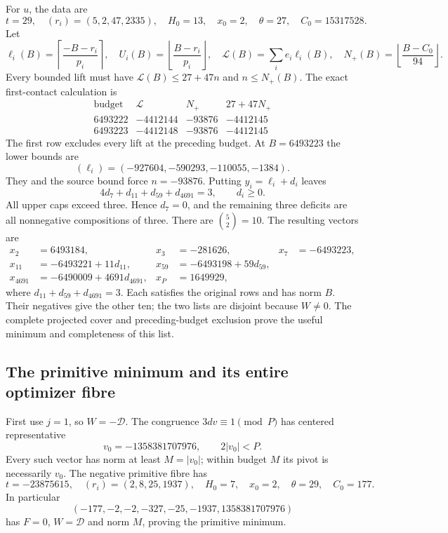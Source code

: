 \documentclass[11pt,a4paper]{article}
\theoremstyle{definition}\newtheorem{question}[theorem]{Question}
\theoremstyle{remark}\newtheorem{remark}[theorem]{Remark}
\newcommand{\Dgen}{\mathcal D}\newcommand{\mpr}{m_{\mathrm{prim}}}
\begin{document}
For \(u\), the data are
\[
 t=29,\quad (r_i)=(5,2,47,2335),\quad H_0=13,\quad
 x_0=2,\quad \theta=27,\quad C_0=15317528.
\]
Let
\[
 \ell_i(B)=\left\lceil\frac{-B-r_i}{p_i}\right\rceil,\quad
 U_i(B)=\left\lfloor\frac{B-r_i}{p_i}\right\rfloor,\quad
 \mathcal L(B)=\sum_i e_i\ell_i(B),\quad
 N_+(B)=\left\lfloor\frac{B-C_0}{94}\right\rfloor.
\]
Every bounded lift must have
\(\mathcal L(B)\le27+47n\) and \(n\le N_+(B)\).
The exact first-contact calculation is
\[
\begin{array}{r|r|r|r}
 \text{budget}&\mathcal L&N_+&27+47N_+\\ \hline
 6493222&-4412144&-93876&-4412145\\
 6493223&-4412148&-93876&-4412145
\end{array}
\]
The first row excludes every lift at the preceding budget.
At \(B=6493223\) the lower bounds are
\[
 (\ell_i)=(-927604,-590293,-110055,-1384).
\]
They and the source bound force \(n=-93876\).
Putting \(y_i=\ell_i+d_i\) leaves
\[
 4d_7+d_{11}+d_{59}+d_{4691}=3,\qquad d_i\ge0.
\]
All upper caps exceed three. Hence \(d_7=0\), and the remaining
three deficits are all nonnegative compositions of three.
There are \(\binom52=10\). The resulting vectors are
\begin{equation}\label{eq:20}
 \begin{aligned}
 x_2&=6493184,&x_3&=-281626,&x_7&=-6493223,\\
 x_{11}&=-6493221+11d_{11},&
 x_{59}&=-6493198+59d_{59},\\
 x_{4691}&=-6490009+4691d_{4691},&
 x_P&=1649929,
 \end{aligned}
\end{equation}
where \(d_{11}+d_{59}+d_{4691}=3\).
Each satisfies the original rows and has norm \(B\).
Their negatives give the other ten; the two lists are disjoint because
\(W\ne0\). The complete projected cover and preceding-budget exclusion
prove the useful minimum and completeness of this list.

\subsection{The primitive minimum and its entire optimizer fibre}
First use \(j=1\), so \(W=-\Dgen\).
The congruence \(3dv\equiv1\pmod P\) has centered representative
\[
 v_0=-1358381707976,\qquad 2|v_0|<P.
\]
Every such vector has norm at least \(M=|v_0|\); within budget \(M\)
its pivot is necessarily \(v_0\).
The negative primitive fibre has
\[
 t=-23875615,\quad(r_i)=(2,8,25,1937),\quad
 H_0=7,\quad x_0=2,\quad\theta=29,\quad C_0=177.
\]
In particular
\[
 (-177,-2,-2,-327,-25,-1937,1358381707976)
\]
has \(F=0\), \(W=\Dgen\) and norm \(M\), proving the primitive minimum.
\end{document}
